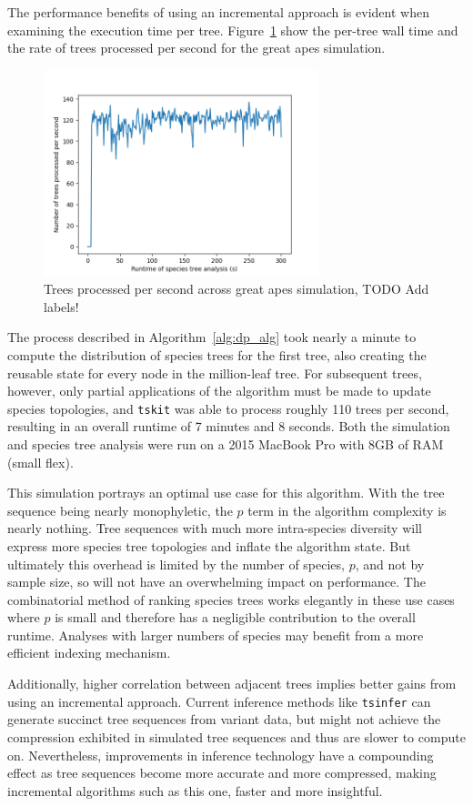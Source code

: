 \documentclass{article}
\newcommand{\tskit}{{\texttt{tskit}}}
\newcommand{\tsinfer}{{\texttt{tsinfer}}}
\begin{document}
The performance benefits of using an incremental approach is evident when
examining the execution time per tree. Figure~\ref{fig:incremental_times}
show the per-tree wall time and the rate of trees processed per second
for the great apes simulation.
\begin{figure}[H]
    \includegraphics[height=6cm]{trees_per_sec.png}
    \centering
    \caption{Trees processed per second across great apes simulation, TODO Add labels!}
    \label{fig:incremental_times}
\end{figure}

The process described in Algorithm~\ref{alg:dp_alg}
took nearly a minute to compute the distribution of species trees for the first tree,
also creating the reusable state for every node in the million-leaf tree.
For subsequent trees, however, only partial
applications of the algorithm must be made to update species topologies, and
\tskit{} was able to process roughly 110 trees per second, resulting in an overall
runtime of 7 minutes and 8 seconds. Both the simulation and species tree analysis
were run on a 2015 MacBook Pro with 8GB of RAM (small flex).

This simulation portrays an optimal use case for this algorithm. With the tree
sequence being nearly monophyletic, the $p$ term in the algorithm complexity is
nearly nothing. Tree sequences with much more intra-species diversity will express
more species tree topologies and inflate the algorithm state. But ultimately this
overhead is limited by the number of species, $p$, and not by sample size, so will
not have an overwhelming impact on performance. The combinatorial method of ranking
species trees works elegantly in these use cases where $p$ is small and therefore has
a negligible contribution to the overall runtime. Analyses with larger numbers of
species may benefit from a more efficient indexing mechanism.

Additionally, higher correlation between adjacent trees implies
better gains from using an incremental approach. Current inference methods
like \tsinfer{} can generate succinct tree sequences from variant data, but might
not achieve the compression exhibited in simulated tree sequences and thus
are slower to compute on. Nevertheless, improvements in inference technology have
a compounding effect as tree sequences become more accurate and more compressed,
making incremental algorithms such as this one, faster and more insightful.
\end{document}
